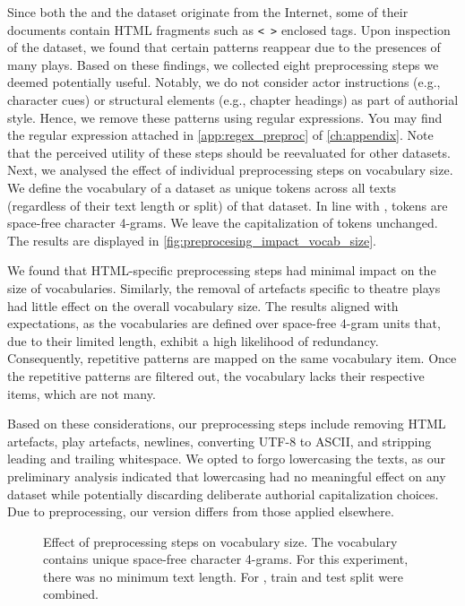 Since both the \dataBlog{} and the \dataPan{} dataset originate from the Internet, some of their documents contain HTML fragments such as \texttt{< >} enclosed tags.
Upon inspection of the \dataGutenberg{} dataset, we found that certain patterns reappear due to the presences of many plays.
Based on these findings, we collected eight preprocessing steps we deemed potentially useful. 
Notably, we do not consider actor instructions (e.g., character cues) or structural elements (e.g., chapter headings) as part of authorial style.
Hence, we remove these patterns using regular expressions.
You may find the regular expression attached in \autoref{app:regex_preproc} of \autoref{ch:appendix}.
Note that the perceived utility of these steps should be reevaluated for other datasets.
Next, we analysed the effect of individual preprocessing steps on vocabulary size.  
We define the vocabulary of a dataset as unique tokens across all texts (regardless of their text length or split) of that dataset.
In line with \citep{koppel_determining_2014}, tokens are space-free character 4-grams.
We leave the capitalization of tokens unchanged. 
The results are displayed in \autoref{fig:preprocesing_impact_vocab_size}.

We found that HTML-specific preprocessing steps had minimal impact on the size of vocabularies.
Similarly, the removal of artefacts specific to theatre plays had little effect on the overall vocabulary size.
The results aligned with expectations, as the vocabularies are defined over space-free 4-gram units that, due to their limited length, exhibit a high likelihood of redundancy.
Consequently, repetitive patterns are mapped on the same vocabulary item.
Once the repetitive patterns are filtered out, the vocabulary lacks their respective items, which are not many.

Based on these considerations, our preprocessing steps include removing HTML artefacts, play artefacts, newlines, converting UTF-8 to ASCII, and stripping leading and trailing whitespace.
We opted to forgo lowercasing the texts, as our preliminary analysis indicated that lowercasing had no meaningful effect on any dataset while potentially discarding deliberate authorial capitalization choices.
Due to preprocessing, our \dataPan{} version differs from those applied elsewhere.

\begin{figure}[htbp]
    \centering
    
    \caption[Effect of preprocessing steps on vocabulary size.]{Effect of preprocessing steps on vocabulary size. The vocabulary contains unique space-free character 4-grams.
    For this experiment, there was no minimum text length.
    For \dataPan{}, train and test split were combined.}
    \label{fig:preprocesing_impact_vocab_size}
\end{figure}


